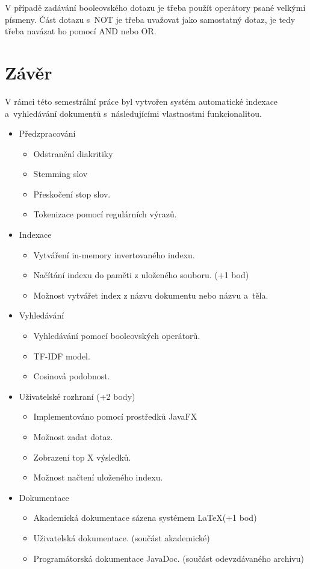 \documentclass[12pt, a4paper]{article}
\begin{document}
V případě zadávání booleovského dotazu je třeba použít operátory psané velkými písmeny. Část dotazu s~NOT je třeba uvažovat jako samostatný dotaz, je tedy třeba navázat ho pomocí AND nebo OR.

\newpage
\section{Závěr}

V rámci této semestrální práce byl vytvořen systém automatické indexace a~vyhledávání dokumentů s~následujícími vlastnostmi funkcionalitou.

\begin{itemize}
\item Předzpracování
	\begin{itemize}
		\item Odstranění diakritiky
		\item Stemming slov
		\item Přeskočení stop slov.
		\item Tokenizace pomocí regulárních výrazů.
	\end{itemize}
\item{Indexace}
		\begin{itemize}
		\item Vytváření in-memory invertovaného indexu.
		\item Načítání indexu do paměti z uloženého souboru. (+1 bod)
		\item Možnost vytvářet index z názvu dokumentu nebo názvu a~těla.
	\end{itemize}
\item{Vyhledávání}
	\begin{itemize}
		\item Vyhledávání pomocí booleovských operátorů.
		\item TF-IDF model.
		\item Cosinová podobnost.
	\end{itemize}
\item{Uživatelské rozhraní (+2 body)}
	\begin{itemize}
		\item Implementováno pomocí prostředků JavaFX 
		\item Možnost zadat dotaz.
		\item Zobrazení top X výsledků.
		\item Možnost načtení uloženého indexu.
	\end{itemize}
\item{Dokumentace}
	\begin{itemize}
		\item Akademická dokumentace sázena systémem \LaTeX (+1 bod)
		\item Uživatelská dokumentace. (součást akademické)
		\item Programátorská dokumentace JavaDoc. (součást odevzdávaného archivu) 
	\end{itemize}	
\end{itemize}
\end{document}
